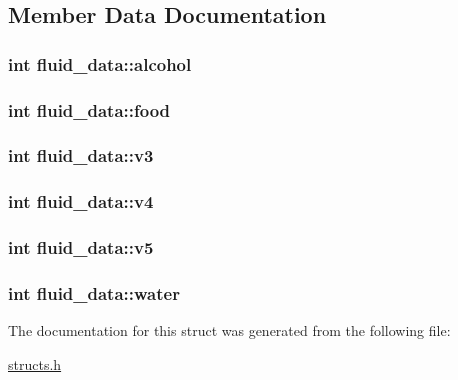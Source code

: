 \subsection{Member Data Documentation}
\hypertarget{structfluid__data_a6d15dae8b3aa315315052fe047edd89e}{
\subsubsection[{alcohol}]{\setlength{\rightskip}{0pt plus 5cm}int fluid\-\_\-data\-::alcohol}}\label{structfluid__data_a6d15dae8b3aa315315052fe047edd89e}
\hypertarget{structfluid__data_af5ca0a549de4f566e247e3598587e624}{
\subsubsection[{food}]{\setlength{\rightskip}{0pt plus 5cm}int fluid\-\_\-data\-::food}}\label{structfluid__data_af5ca0a549de4f566e247e3598587e624}
\hypertarget{structfluid__data_a589cb2f93512c1c08537d1f0322832a6}{
\subsubsection[{v3}]{\setlength{\rightskip}{0pt plus 5cm}int fluid\-\_\-data\-::v3}}\label{structfluid__data_a589cb2f93512c1c08537d1f0322832a6}
\hypertarget{structfluid__data_ade41b11f5764b1220f32b417530ec211}{
\subsubsection[{v4}]{\setlength{\rightskip}{0pt plus 5cm}int fluid\-\_\-data\-::v4}}\label{structfluid__data_ade41b11f5764b1220f32b417530ec211}
\hypertarget{structfluid__data_af901e42057163d59ae82103e535e3088}{
\subsubsection[{v5}]{\setlength{\rightskip}{0pt plus 5cm}int fluid\-\_\-data\-::v5}}\label{structfluid__data_af901e42057163d59ae82103e535e3088}
\hypertarget{structfluid__data_a30eedc44b205cac9e29cb28cd054395b}{
\subsubsection[{water}]{\setlength{\rightskip}{0pt plus 5cm}int fluid\-\_\-data\-::water}}\label{structfluid__data_a30eedc44b205cac9e29cb28cd054395b}


The documentation for this struct was generated from the following file\-:\begin{DoxyCompactItemize}
\item 
\hyperlink{structs_8h}{structs.\-h}\end{DoxyCompactItemize}
